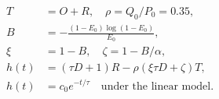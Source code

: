 \documentclass{article}
\begin{document}
\fontsize{22}{29}\selectfont
\[
\begin{aligned}T&=O+R,\quad \rho=Q_0/P_0=0.35,\\B&=-\frac{(1-E_0)\log(1-E_0)}{E_0},\\\xi&=1-B,\quad\zeta=1-B/\alpha,\\h(t)&=(\tau D+1)R-\rho(\xi\tau D+\zeta)T,\\h(t)&=c_0e^{-t/\tau}\quad\text{under the linear model}.\end{aligned}
\]
\end{document}
